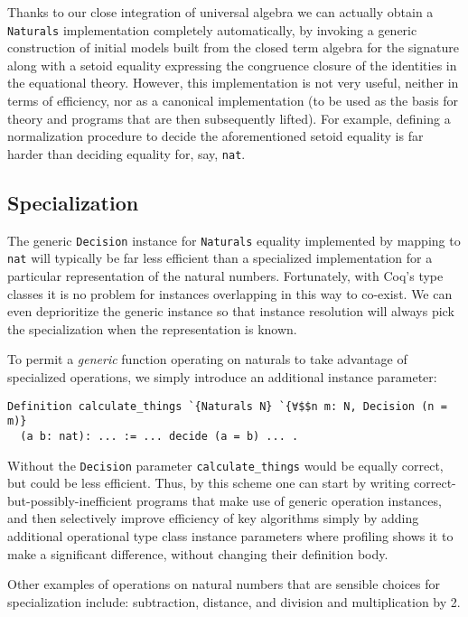 \documentclass[a4paper,10pt,runningheads]{llncs}
\begin{document}
Thanks to our close integration of universal algebra we can actually obtain a \lstinline|Naturals| implementation completely automatically, by invoking a generic construction of initial models built from the closed term algebra for the signature along with a setoid equality expressing the congruence closure of the identities in the equational theory. However, this implementation is not very useful, neither in terms of efficiency, nor as a canonical implementation (to be used as the basis for theory and programs that are then subsequently lifted). For example, defining a normalization procedure to decide the aforementioned setoid equality is far harder than deciding equality for, say, \lstinline|nat|.

\subsection{Specialization}

The generic \lstinline|Decision| instance for \lstinline|Naturals| equality implemented by mapping to \lstinline|nat| will typically be far less efficient than a specialized implementation for a particular representation of the natural numbers. Fortunately, with Coq's type classes it is no problem for instances overlapping in this way to co-exist. We can even deprioritize the generic instance so that instance resolution will always pick the specialization when the representation is known.

To permit a \emph{generic} function operating on naturals to take advantage of specialized operations, we simply introduce an additional instance parameter:
\begin{lstlisting}
Definition calculate_things `{Naturals N} `{∀$$n m: N, Decision (n = m)}
  (a b: nat): ... := ... decide (a = b) ... .
\end{lstlisting}
Without the \lstinline|Decision| parameter \lstinline|calculate_things| would be equally correct, but could be less efficient. Thus, by this scheme one can start by writing correct-but-possibly-inefficient programs that make use of generic operation instances, and then selectively improve efficiency of key algorithms simply by adding additional operational type class instance parameters where profiling shows it to make a significant difference, without changing their definition body.

Other examples of operations on natural numbers that are sensible choices for specialization include: subtraction, distance, and division and multiplication by 2.
\end{document}
